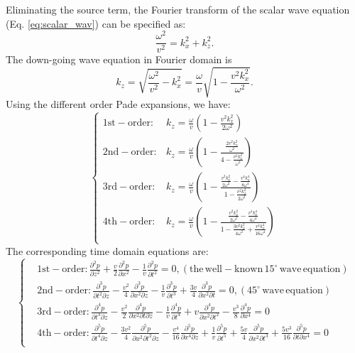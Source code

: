 Eliminating the source term, the Fourier transform of the scalar wave equation (Eq. \eqref{eq:scalar_wav}) can be specified as:
\begin{equation}
\frac{\omega^2}{v^2}=k_x^2+k_z^2.
\end{equation}
The down-going wave equation in Fourier domain is
\begin{equation}
k_z=\sqrt{\frac{\omega^2}{v^2}-k_x^2}=\frac{\omega}{v}\sqrt{1-\frac{v^2k_x^2}{\omega^2}}.
\end{equation}
Using the different order Pade expansions, we have:
\begin{equation}\left\{
\begin{split}
\mathrm{1st-order:} &k_z=\frac{\omega}{v}\left(1-\frac{v^2k_x^2}{2\omega^2}\right)\\
\mathrm{2nd-order:} &k_z=\frac{\omega}{v}\left(1-\frac{\frac{2v^2k_x^2}{\omega^2}}{4-\frac{v^2k_x^2}{\omega^2}}\right)\\
\mathrm{3rd-order:} &k_z=\frac{\omega}{v}\left(1-\frac{\frac{v^2k_x^2}{2\omega^2}-\frac{v^4 k_x^4}{8\omega^4}}{1-\frac{v^2k_x^2}{2\omega^2}}\right)\\
\mathrm{4th-order:} &k_z=\frac{\omega}{v}\left(1-\frac{\frac{v^2k_x^2}{2\omega^2}-\frac{v^4 k_x^4}{4\omega^4}}{1-\frac{3v^2k_x^2}{4\omega^2}+\frac{v^4k_x^4}{16\omega^4}}\right)\\
\end{split}\right.
\end{equation}
The corresponding time domain equations are:
\begin{equation}\left\{
\begin{split}
&\mathrm{1st-order:}
\frac{\partial^2 p}{\partial z^2}+\frac{v}{2}\frac{\partial^2 p}{\partial x^2}
-\frac{1}{v}\frac{\partial^2 p}{\partial t^2}=0, \mathrm{(the \, well-known\, 15^{\circ}\, wave\, equation)}\\
&\mathrm{2nd-order:}
\frac{\partial^3 p}{\partial t^2\partial z}-\frac{v^2}{4}\frac{\partial^3 p}{\partial x^2\partial z}-\frac{1}{v}\frac{\partial^3 p}{\partial t^3}+\frac{3v}{4}\frac{\partial^3 p}{\partial x^2\partial t}=0,  \mathrm{(45^{\circ}\, wave\, equation)}\\
&\mathrm{3rd-order:}
\frac{\partial^4 p}{\partial t^3\partial z}-\frac{v^2}{2}\frac{\partial^4 p}{\partial x^2\partial t\partial z}-\frac{1}{v}\frac{\partial^4 p}{\partial t^4}+v\frac{\partial^4 p}{\partial x^2\partial t^2}-\frac{v^3}{8}\frac{\partial^4 p}{\partial x^4}=0\\
&\mathrm{4th-order:}
\frac{\partial^5 p}{\partial t^4\partial z}-\frac{3v^2}{4}\frac{\partial^5 p}{\partial x^2\partial t^2\partial z}-\frac{v^4}{16}\frac{\partial^5 p}{\partial x^4\partial z}
+\frac{1}{v}\frac{\partial^5 p}{\partial t^5}
+\frac{5v}{4}\frac{\partial^5 p}{\partial x^2\partial t^3}+\frac{5v^3}{16}\frac{\partial^5 p}{\partial t\partial x^4}=0\\
\end{split}\right.
\end{equation}

